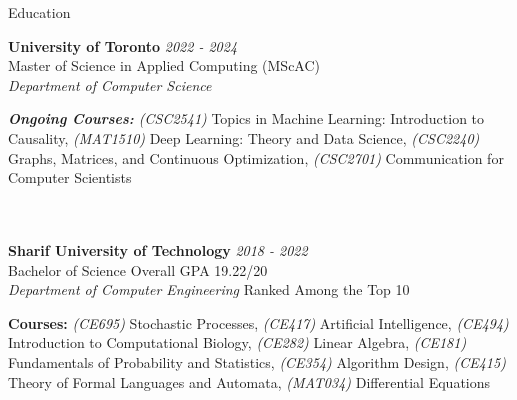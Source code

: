 \documentclass{resume} %
\begin{document}
\begin{rSection}{Education}

{\bf University of Toronto} \hfill \textcolor{Black!70}{\em 2022 - 2024} 
\\ \textcolor{Black!70}{Master of Science in Applied Computing (MScAC)}
\\ {\it Department of Computer Science}
\\
\begin{footnotesize}
{\it {\textcolor{Black!70}{\bf Ongoing Courses:}} (CSC2541)} Topics in Machine Learning: Introduction to Causality, {\it (MAT1510)} Deep Learning: Theory and Data Science, {\it (CSC2240)} Graphs, Matrices, and Continuous Optimization, {\it (CSC2701)} Communication for Computer Scientists
\end{footnotesize}
\\
\\
{\bf Sharif University of Technology} \hfill \textcolor{Black!70}{\em 2018 - 2022} 
\\ \textcolor{Black!70}{Bachelor of Science} \hfill \textcolor{Black!70}{ Overall GPA 19.22/20}
\\ {\it Department of Computer Engineering} \hfill \textcolor{Black!70}{Ranked Among the Top 10}
\\
\begin{footnotesize}
{\textcolor{Black!70}{\bf Courses:}} {\it (CE695)} Stochastic Processes, {\it (CE417)} Artificial Intelligence, {\it (CE494)} Introduction to Computational Biology, {\it (CE282)} Linear Algebra, {\it (CE181)} Fundamentals of Probability and Statistics, {\it (CE354)} Algorithm Design, {\it (CE415)} Theory of Formal Languages and Automata, {\it (MAT034)} Differential Equations
\end{footnotesize}



\end{rSection}
\end{document}
